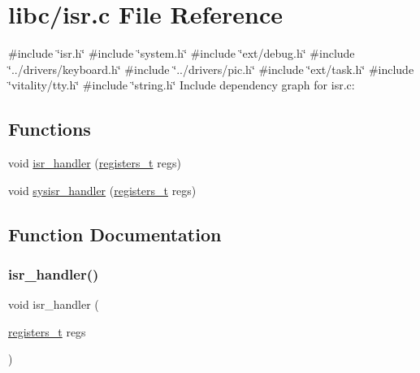 \hypertarget{a00077}{}\section{libc/isr.c File Reference}
\label{a00077}
{\ttfamily \#include \char`\"{}isr.\+h\char`\"{}}\newline
{\ttfamily \#include \char`\"{}system.\+h\char`\"{}}\newline
{\ttfamily \#include \char`\"{}ext/debug.\+h\char`\"{}}\newline
{\ttfamily \#include \char`\"{}../drivers/keyboard.\+h\char`\"{}}\newline
{\ttfamily \#include \char`\"{}../drivers/pic.\+h\char`\"{}}\newline
{\ttfamily \#include \char`\"{}ext/task.\+h\char`\"{}}\newline
{\ttfamily \#include \char`\"{}vitality/tty.\+h\char`\"{}}\newline
{\ttfamily \#include \char`\"{}string.\+h\char`\"{}}\newline
Include dependency graph for isr.\+c\+:
\subsection*{Functions}
\begin{DoxyCompactItemize}
\item 
void \hyperlink{a00077_a700e3ca056bf69296370f504f2cb6cc8_a700e3ca056bf69296370f504f2cb6cc8}{isr\+\_\+handler} (\hyperlink{a00080_adf58dbaf6139b4957c348711f2026957_adf58dbaf6139b4957c348711f2026957}{registers\+\_\+t} regs)
\item 
void \hyperlink{a00077_abd1fa375737cd5ecd84c082738e3b195_abd1fa375737cd5ecd84c082738e3b195}{sysisr\+\_\+handler} (\hyperlink{a00080_adf58dbaf6139b4957c348711f2026957_adf58dbaf6139b4957c348711f2026957}{registers\+\_\+t} regs)
\end{DoxyCompactItemize}


\subsection{Function Documentation}
\mbox{\label{a00077_a700e3ca056bf69296370f504f2cb6cc8_a700e3ca056bf69296370f504f2cb6cc8}} 
\subsubsection{\texorpdfstring{isr\+\_\+handler()}{isr\_handler()}}
{\footnotesize\ttfamily void isr\+\_\+handler (\begin{DoxyParamCaption}\item[{\hyperlink{a00080_adf58dbaf6139b4957c348711f2026957_adf58dbaf6139b4957c348711f2026957}{registers\+\_\+t}}]{regs }\end{DoxyParamCaption})}




